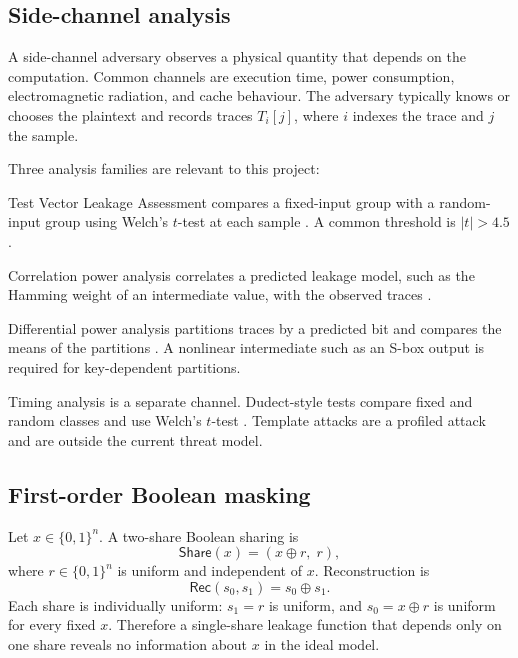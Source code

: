 \documentclass[11pt,a4paper]{article}
\newcommand{\bits}{\{0,1\}}
\newcommand{\Rec}{\mathsf{Rec}}
\newcommand{\Share}{\mathsf{Share}}
\theoremstyle{plain}
\theoremstyle{definition}
\theoremstyle{remark}
\begin{document}
\subsection{Side-channel analysis}

A side-channel adversary observes a physical quantity that depends on the computation.
Common channels are execution time, power consumption, electromagnetic radiation, and
cache behaviour. The adversary typically knows or chooses the plaintext and records
traces \(T_i[j]\), where \(i\) indexes the trace and \(j\) the sample.

Three analysis families are relevant to this project:

\begin{description}[leftmargin=1.5em]
  \item[TVLA.] Test Vector Leakage Assessment compares a fixed-input group with a
        random-input group using Welch's \(t\)-test at each sample
        \citep{goodwill2011tvla,schneider2015leakage}. A common threshold is
        \(|t|>4.5\).
  \item[CPA.] Correlation power analysis correlates a predicted leakage model, such as
        the Hamming weight of an intermediate value, with the observed traces
        \citep{brier2004cpa}.
  \item[DPA.] Differential power analysis partitions traces by a predicted bit and
        compares the means of the partitions \citep{kocher1999dpa}. A nonlinear
        intermediate such as an S-box output is required for key-dependent partitions.
\end{description}

Timing analysis is a separate channel. Dudect-style tests compare fixed and random
classes and use Welch's \(t\)-test \citep{reparaz2017dudect}. Template attacks
\citep{chari2002template} are a profiled attack and are outside the current threat
model.

\subsection{First-order Boolean masking}

Let \(x\in\bits^n\). A two-share Boolean sharing is
\[
  \Share(x) = (x\oplus r,\; r),
\]
where \(r\in\bits^n\) is uniform and independent of \(x\). Reconstruction is
\[
  \Rec(s_0,s_1) = s_0\oplus s_1.
\]
Each share is individually uniform: \(s_1=r\) is uniform, and \(s_0=x\oplus r\) is
uniform for every fixed \(x\). Therefore a single-share leakage function that depends
only on one share reveals no information about \(x\) in the ideal model.
\end{document}
